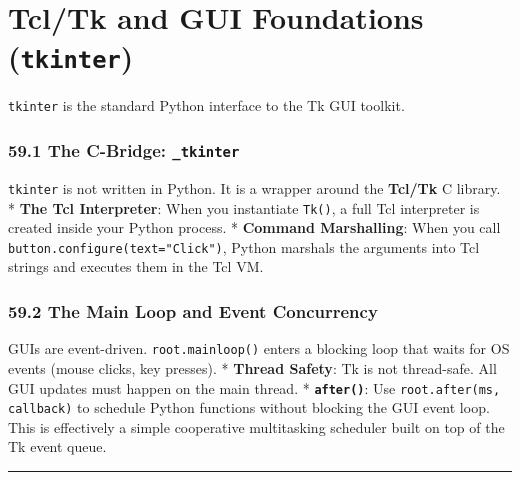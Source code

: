 \hypertarget{tcltk-and-gui-foundations-tkinter}{%
\chapter{\texorpdfstring{Tcl/Tk and GUI Foundations
(\texttt{tkinter})}{Tcl/Tk and GUI Foundations (tkinter)}}\label{tcltk-and-gui-foundations-tkinter}}

\passthrough{\lstinline!tkinter!} is the standard Python interface to
the Tk GUI toolkit.

\hypertarget{the-c-bridge-_tkinter}{%
\subsection{\texorpdfstring{59.1 The C-Bridge:
\texttt{\_tkinter}}{59.1 The C-Bridge: \_tkinter}}\label{the-c-bridge-_tkinter}}

\passthrough{\lstinline!tkinter!} is not written in Python. It is a
wrapper around the \textbf{Tcl/Tk} C library. * \textbf{The Tcl
Interpreter}: When you instantiate \passthrough{\lstinline!Tk()!}, a
full Tcl interpreter is created inside your Python process. *
\textbf{Command Marshalling}: When you call
\passthrough{\lstinline!button.configure(text="Click")!}, Python
marshals the arguments into Tcl strings and executes them in the Tcl VM.

\hypertarget{the-main-loop-and-event-concurrency}{%
\subsection{59.2 The Main Loop and Event
Concurrency}\label{the-main-loop-and-event-concurrency}}

GUIs are event-driven. \passthrough{\lstinline!root.mainloop()!} enters
a blocking loop that waits for OS events (mouse clicks, key presses). *
\textbf{Thread Safety}: Tk is not thread-safe. All GUI updates must
happen on the main thread. * \textbf{\passthrough{\lstinline!after()!}}:
Use \passthrough{\lstinline!root.after(ms, callback)!} to schedule
Python functions without blocking the GUI event loop. This is
effectively a simple cooperative multitasking scheduler built on top of
the Tk event queue.

\begin{center}\rule{0.5\linewidth}{0.5pt}\end{center}
